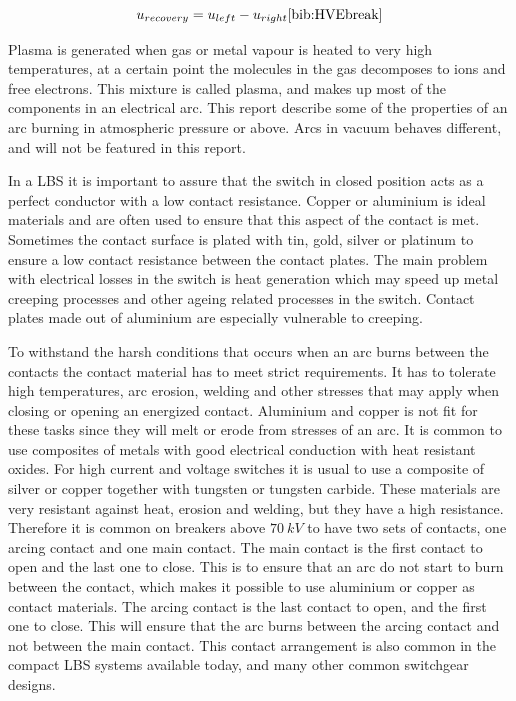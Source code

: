 \documentclass[10pt,a4paper]{article} %
\begin{document}
\begin{equation} \label{eq:U_rec}
u_{recovery}=u_{left}-u_{right} \cite{bib:HVEbreak}
\end{equation} 

Plasma is generated when gas or metal vapour is heated to very high temperatures, at a certain point the molecules in the gas decomposes to ions and free electrons. This mixture is called plasma, and makes up most of the components in an electrical arc. This report describe some of the properties of an arc burning in atmospheric pressure or above. Arcs in vacuum behaves different, and will not be featured in this report.


In a LBS it is important to assure that the switch in closed position acts as a perfect conductor with a low contact resistance. Copper or aluminium is ideal materials and are often used to ensure that this aspect of the contact is met. Sometimes the contact surface is plated with tin, gold, silver or platinum to ensure a low contact resistance between the contact plates. The main problem with electrical losses in the switch is heat generation which may speed up metal creeping processes and other ageing related processes in the switch. Contact plates made out of aluminium are especially vulnerable to creeping.
 
To withstand the harsh conditions that occurs when an arc burns between the contacts the contact material has to meet strict requirements. It has to tolerate high temperatures, arc erosion, welding and other stresses that may apply when closing or opening an energized contact. Aluminium and copper is not fit for these tasks since they will melt or erode from stresses of an arc. It is common to use composites of metals with good electrical conduction with heat resistant oxides. For high current and voltage switches it is usual to use a composite of silver or copper together with tungsten or tungsten carbide. These materials are very resistant against heat, erosion and welding, but they have a high resistance. Therefore it is common on breakers above $70 \ kV$ to have two sets of contacts, one arcing contact and one main contact. The main contact is the first contact to open and the last one to close. This is to ensure that an arc do not start to burn between the contact, which makes it possible to use aluminium or copper as contact materials. The arcing contact is the last contact to open, and the first one to close. This will ensure that the arc burns between the arcing contact and not between the main contact. This contact arrangement is also common in the compact LBS systems available today, and many other common switchgear designs.
\end{document}
